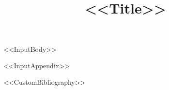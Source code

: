 \documentclass[%
SecEq,
CM,
GP,
<<DocumentClassOptions>>]{degruyter-crelle}
\title[<<ShortTitle>>]{<<Title>>}
\begin{document}

<<InputBody>>


\appendix
<<InputAppendix>>

<<CustomBibliography>>
\end{document}
